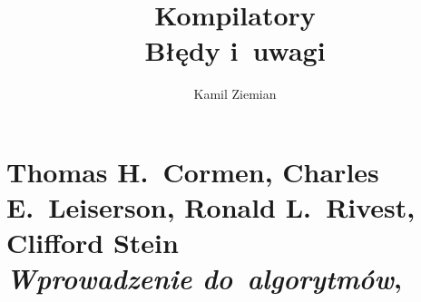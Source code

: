 \documentclass[a4paper,11pt]{article}
\title{Kompilatory \\
  {\Large Błędy i~uwagi}}
\author{Kamil Ziemian}
\numberwithin{equation}{section}
\begin{document}





\maketitle





\tableofcontents





\section{Thomas H.~Cormen, Charles E.~Leiserson, Ronald L.~Rivest, Clifford Stein \\
  \textit{Wprowadzenie do~algorytmów},
  \cite{CormenAtAlWprowadzenieDoAlgorytmow2022}}

\vspace{0em}



\vspace{0em}



\end{document}
